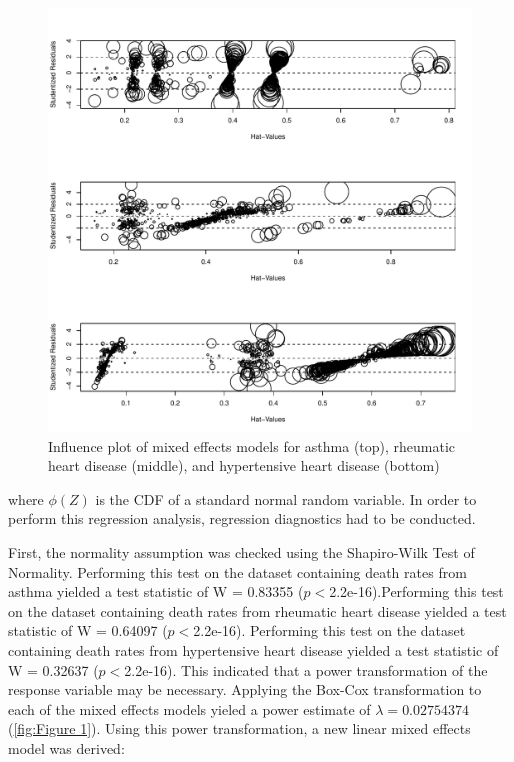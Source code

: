 \documentclass[12pt, letterpaper, twoside]{article}\usepackage[]{graphicx}\usepackage[]{xcolor}
\begin{document}
\begin{figure}[t]
\includegraphics[scale=0.5]{influenceplot.pdf}
\centering
\caption{Influence plot of mixed effects models for asthma (top), rheumatic heart
disease (middle), and hypertensive heart disease (bottom)}
\label{fig:Figure 5}
    \vspace{1cm}
\end{figure}

where \begin{math}\phi(Z)\end{math} is the CDF of a standard normal random
variable. In order to perform this regression analysis, regression diagnostics
had to be conducted.\par

First, the normality assumption was checked using the
Shapiro-Wilk Test of Normality. Performing this test on the dataset containing
death rates from asthma yielded a test statistic of W = 0.83355
(\begin{math}p<\end{math}2.2e-16).Performing this test on the dataset containing
death rates from rheumatic heart disease yielded a test statistic of W = 0.64097
(\begin{math}p<\end{math}2.2e-16). Performing this test on the dataset containing
death rates from hypertensive heart disease yielded a test statistic of
W = 0.32637 (\begin{math}p<\end{math}2.2e-16). This indicated that a power
transformation of the response variable may be necessary. Applying the Box-Cox
transformation to each of the mixed effects models yieled a power estimate of
\begin{math}\lambda=0.02754374\end{math} (\autoref{fig:Figure 1}). Using this
power transformation, a new linear mixed effects model was derived:
\end{document}
